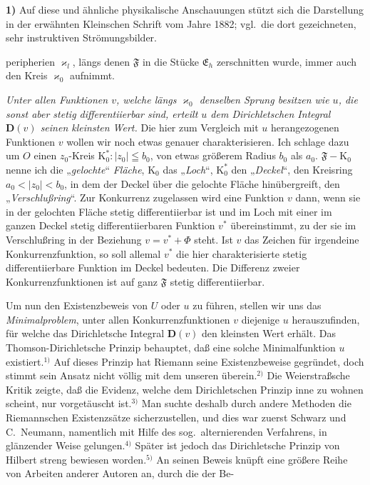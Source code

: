 \documentclass{article}
\begin{document}
\textbf{1)} Auf diese und ähnliche physikalische Anschauungen stützt sich die Darstellung in der erwähnten Kleinschen Schrift vom Jahre 1882; vgl.\ die dort gezeichneten, sehr instruktiven Strömungsbilder.

peripherien $\varkappa_l$, längs denen $\mathfrak{F}$ in die Stücke $\mathfrak{E}_h$ zerschnitten wurde, immer auch den Kreis $\varkappa_0$ aufnimmt.

\emph{Unter allen Funktionen $v$, welche längs $\varkappa_0$ denselben Sprung besitzen wie $u$, die sonst aber stetig differentiierbar sind, erteilt $u$ dem Dirichletschen Integral $\mathbf{D}(v)$ seinen kleinsten Wert.} Die hier zum Vergleich mit $u$ herangezogenen Funktionen $v$ wollen wir noch etwas genauer charakterisieren. Ich schlage dazu um $O$ einen $z_0$-Kreis $\mathrm{K}_0^*\colon |z_0| \leqq b_0$, von etwas größerem Radius $b_0$ als $a_0$. $\mathfrak{F} - \mathrm{K}_0$ nenne ich die „\emph{gelochte}“ \emph{Fläche}, $\mathrm{K}_0$ das „\emph{Loch}“, $\mathrm{K}_0^*$ den „\emph{Deckel}“, den Kreisring $a_0 < |z_0| < b_0$, in dem der Deckel über die gelochte Fläche hinübergreift, den „\emph{Verschlußring}“. Zur Konkurrenz zugelassen wird eine Funktion $v$ dann, wenn sie in der gelochten Fläche stetig differentiierbar ist und im Loch mit einer im ganzen Deckel stetig differentiierbaren Funktion $v^*$ übereinstimmt, zu der sie im Verschlußring in der Beziehung $v = v^* + \Phi$ steht. Ist $v$ das Zeichen für irgendeine Konkurrenzfunktion, so soll allemal $v^*$ die hier charakterisierte stetig differentiierbare Funktion im Deckel bedeuten. Die Differenz zweier Konkurrenzfunktionen ist auf ganz $\mathfrak{F}$ stetig differentiierbar.

Um nun den Existenzbeweis von $U$ oder $u$ zu führen, stellen wir uns das \emph{Minimalproblem}, unter allen Konkurrenzfunktionen $v$ diejenige $u$ herauszufinden, für welche das Dirichletsche Integral $\mathbf{D}(v)$ den kleinsten Wert erhält. Das Thomson-Dirichletsche Prinzip behauptet, daß eine solche Minimalfunktion $u$ existiert.${}^{1)}$ Auf dieses Prinzip hat Riemann seine Existenzbeweise gegründet, doch stimmt sein Ansatz nicht völlig mit dem unseren überein.${}^{2)}$ Die Weierstraßsche Kritik zeigte, daß die Evidenz, welche dem Dirichletschen Prinzip inne zu wohnen scheint, nur vorgetäuscht ist.${}^{3)}$ Man suchte deshalb durch andere Methoden die Riemannschen Existenzsätze sicherzustellen, und dies war zuerst Schwarz und C.~Neumann, namentlich mit Hilfe des sog.\ alternierenden Verfahrens, in glänzender Weise gelungen.${}^{4)}$ Später ist jedoch das Dirichletsche Prinzip von Hilbert streng bewiesen worden.${}^{5)}$ An seinen Beweis knüpft eine größere Reihe von Arbeiten anderer Autoren an, durch die der Be-
\end{document}
